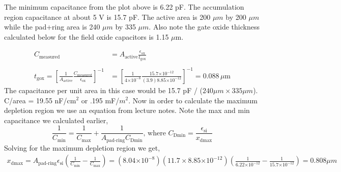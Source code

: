 \documentclass{article}
\providecommand{\e}[1]{\ensuremath{\times 10^{#1}}}
\begin{document}
The minimum capacitance from the plot above is 6.22 pF. The accumulation region capacitance at about 5 V is 15.7 pF. The active area is 200 $\mu m$ by 200 $\mu m$ while the pad+ring area is 240 $\mu m$ by 335 $\mu m$. Also note the gate oxide thickness calculated below for the field oxide capacitors is 1.15 $\mu$m.

\begin{align*}
C_{\text{measured}} &= A_{\text{active}}\frac{\epsilon_{\text{ox}}}{t_{\text{gox}}} \\ \\
t_{\text{gox}} = [\frac{1}{A_{\text{active}}}\frac{C_{\text{measured}}}{\epsilon_{\text{ox}}}]^{-1}&= [\frac{1}{4\e{-8}}\frac{15.7\e{-12}}{(3.9)8.85\e{-12}}]^{-1} = 0.088 \,\mu\text{m}
\end{align*}
The capacitance per unit area in this case would be 15.7 pF / ($240 \mu m \times 335 \mu m$). C/area = 19.55 nF/$\text{cm}^2$ or .195 mF/$m^{2}$. Now in order to calculate the maximum depletion region we use an equation from lecture notes. Note the max and min capacitance we calculated earlier,
\begin{equation}
\frac{1}{C_{\text{min}}} = \frac{1}{C_{\text{max}}} + \frac{1}{A_{\text{pad-ring}} C_{\text{Dmin}}},\,\text{where } C_{\text{Dmin}} = \frac{\epsilon_{\text{si}}}{x_{\text{dmax}}}
\end{equation}
Solving for the maximum depletion region we get,
\begin{align*}
x_{\text{dmax}} = A_{\text{pad-ring}}\epsilon_{\text{si}}(\frac{1}{C_{\text{min}}} - \frac{1}{C_{\text{max}}}) = (8.04\e{-8})(11.7 \times 8.85\e{-12})(\frac{1}{6.22\e{-12}} - \frac{1}{15.7\e{-12}}) = 0.808 \mu m
\end{align*}
\end{document}
